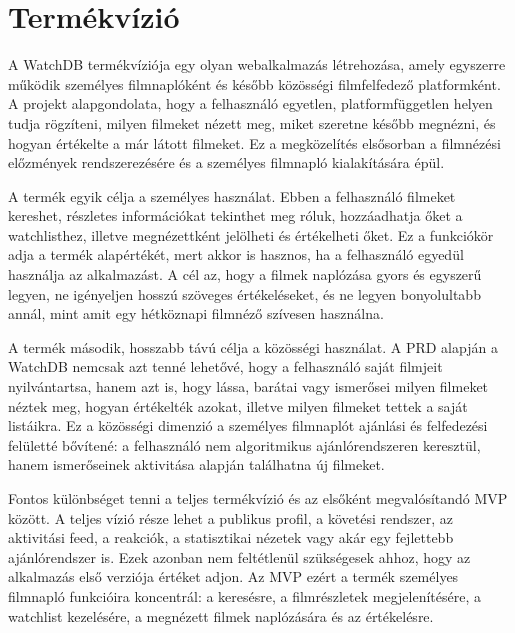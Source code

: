 \section{Termékvízió}

A WatchDB termékvíziója egy olyan webalkalmazás létrehozása, amely egyszerre működik személyes filmnaplóként és később közösségi filmfelfedező platformként. A projekt alapgondolata, hogy a felhasználó egyetlen, platformfüggetlen helyen tudja rögzíteni, milyen filmeket nézett meg, miket szeretne később megnézni, és hogyan értékelte a már látott filmeket. Ez a megközelítés elsősorban a filmnézési előzmények rendszerezésére és a személyes filmnapló kialakítására épül.

A termék egyik célja a személyes használat. Ebben a felhasználó filmeket kereshet, részletes információkat tekinthet meg róluk, hozzáadhatja őket a watchlisthez, illetve megnézettként jelölheti és értékelheti őket. Ez a funkciókör adja a termék alapértékét, mert akkor is hasznos, ha a felhasználó egyedül használja az alkalmazást. A cél az, hogy a filmek naplózása gyors és egyszerű legyen, ne igényeljen hosszú szöveges értékeléseket, és ne legyen bonyolultabb annál, mint amit egy hétköznapi filmnéző szívesen használna.

A termék második, hosszabb távú célja a közösségi használat. A PRD alapján a WatchDB nemcsak azt tenné lehetővé, hogy a felhasználó saját filmjeit nyilvántartsa, hanem azt is, hogy lássa, barátai vagy ismerősei milyen filmeket néztek meg, hogyan értékelték azokat, illetve milyen filmeket tettek a saját listáikra. Ez a közösségi dimenzió a személyes filmnaplót ajánlási és felfedezési felületté bővítené: a felhasználó nem algoritmikus ajánlórendszeren keresztül, hanem ismerőseinek aktivitása alapján találhatna új filmeket.

Fontos különbséget tenni a teljes termékvízió és az elsőként megvalósítandó MVP között. A teljes vízió része lehet a publikus profil, a követési rendszer, az aktivitási feed, a reakciók, a statisztikai nézetek vagy akár egy fejlettebb ajánlórendszer is. Ezek azonban nem feltétlenül szükségesek ahhoz, hogy az alkalmazás első verziója értéket adjon. Az MVP ezért a termék személyes filmnapló funkcióira koncentrál: a keresésre, a filmrészletek megjelenítésére, a watchlist kezelésére, a megnézett filmek naplózására és az értékelésre.